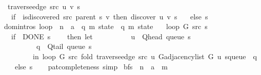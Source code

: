 \begin{isabellebody}
\ \ {\isachardoublequoteopen}traverse{\isacharunderscore}{\kern0pt}edge\ src\ u\ v\ s\ {\isasymequiv}\isanewline
\ \ \ if\ {\isasymnot}\ is{\isacharunderscore}{\kern0pt}discovered\ src\ {\isacharparenleft}{\kern0pt}parent\ s{\isacharparenright}{\kern0pt}\ v\ then\ discover\ u\ v\ s\isanewline
\ \ \ else\ s{\isachardoublequoteclose}\isanewline
\isanewline
{}\isamarkupfalse%
\ {\isacharparenleft}{\kern0pt}domintros{\isacharparenright}{\kern0pt}\ loop\ {\isacharcolon}{\kern0pt}{\isacharcolon}{\kern0pt}\ {\isachardoublequoteopen}{\isacharprime}{\kern0pt}n\ {\isasymRightarrow}\ {\isacharprime}{\kern0pt}a\ {\isasymRightarrow}\ {\isacharparenleft}{\kern0pt}{\isacharprime}{\kern0pt}q{\isacharcomma}{\kern0pt}\ {\isacharprime}{\kern0pt}m{\isacharparenright}{\kern0pt}\ state\ {\isasymRightarrow}\ {\isacharparenleft}{\kern0pt}{\isacharprime}{\kern0pt}q{\isacharcomma}{\kern0pt}\ {\isacharprime}{\kern0pt}m{\isacharparenright}{\kern0pt}\ state{\isachardoublequoteclose}\ \isanewline
\ \ {\isachardoublequoteopen}loop\ G\ src\ s\ {\isacharequal}{\kern0pt}\isanewline
\ \ \ {\isacharparenleft}{\kern0pt}if\ {\isasymnot}\ DONE\ s\isanewline
\ \ \ \ then\ let\isanewline
\ \ \ \ \ \ \ \ \ \ u\ {\isacharequal}{\kern0pt}\ Q{\isacharunderscore}{\kern0pt}head\ {\isacharparenleft}{\kern0pt}queue\ s{\isacharparenright}{\kern0pt}{\isacharsemicolon}{\kern0pt}\isanewline
\ \ \ \ \ \ \ \ \ \ q\ {\isacharequal}{\kern0pt}\ Q{\isacharunderscore}{\kern0pt}tail\ {\isacharparenleft}{\kern0pt}queue\ s{\isacharparenright}{\kern0pt}\isanewline
\ \ \ \ \ \ \ \ \ in\ loop\ G\ src\ {\isacharparenleft}{\kern0pt}fold\ {\isacharparenleft}{\kern0pt}traverse{\isacharunderscore}{\kern0pt}edge\ src\ u{\isacharparenright}{\kern0pt}\ {\isacharparenleft}{\kern0pt}G{\isachardot}{\kern0pt}adjacency{\isacharunderscore}{\kern0pt}list\ G\ u{\isacharparenright}{\kern0pt}\ {\isacharparenleft}{\kern0pt}s{\isasymlparr}queue\ {\isacharcolon}{\kern0pt}{\isacharequal}{\kern0pt}\ q{\isasymrparr}{\isacharparenright}{\kern0pt}{\isacharparenright}{\kern0pt}\isanewline
\ \ \ \ else\ s{\isacharparenright}{\kern0pt}{\isachardoublequoteclose}\isanewline
%
\isadelimproof
\ \ %
\endisadelimproof
%
\isatagproof
{}\isamarkupfalse%
\ pat{\isacharunderscore}{\kern0pt}completeness\ simp%
\endisatagproof
{\isafoldproof}%
%
\isadelimproof
\isanewline
%
\endisadelimproof
\isanewline
{}\isamarkupfalse%
\ bfs\ {\isacharcolon}{\kern0pt}{\isacharcolon}{\kern0pt}\ {\isachardoublequoteopen}{\isacharprime}{\kern0pt}n\ {\isasymRightarrow}\ {\isacharprime}{\kern0pt}a\ {\isasymRightarrow}\ {\isacharprime}{\kern0pt}m{\isachardoublequoteclose}\ \isanewline

\end{isabellebody}
